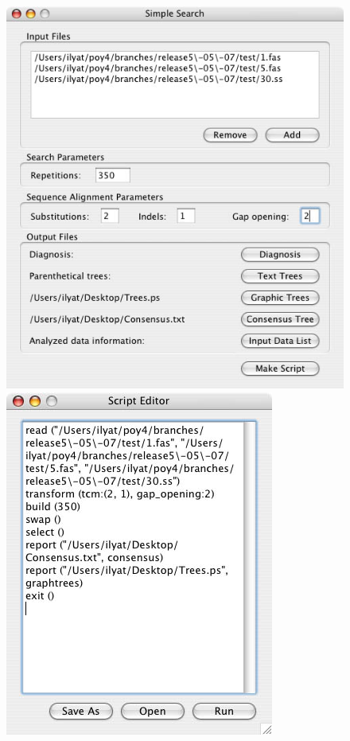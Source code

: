  \begin{figure}
\centering
\begin{minipage}[c]{0.48\textwidth}
   		\includegraphics[width=\textwidth]{figures/simplesearch_window_filled.jpg}
\end{minipage}
\quad
\begin{minipage}[c]{0.48\textwidth}
	   	\includegraphics[width=\textwidth]{figures/simplesearch_script.jpg}

\end{minipage}
\end{figure}
